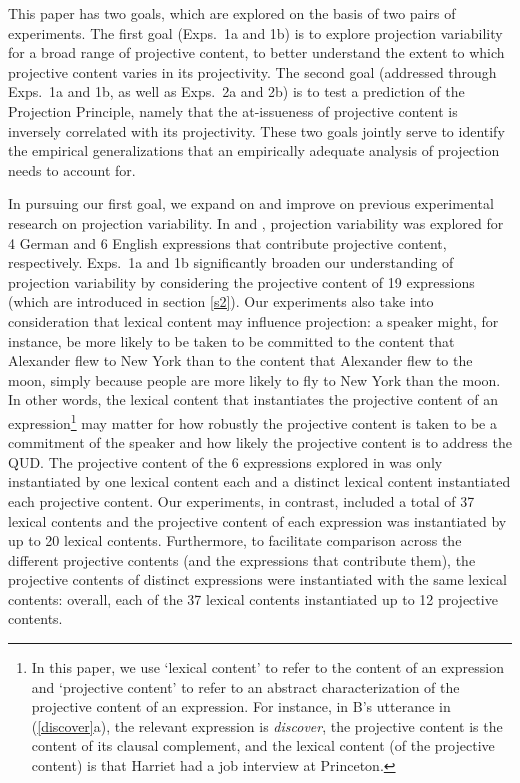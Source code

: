 \documentclass[11pt,fleqn]{article}
\newcommand{\6}{\mbox{$[\hspace*{-.6mm}[$}}
\newcommand{\9}{\mbox{$]\hspace*{-.6mm}]$}}
\begin{document}
This paper has two goals, which are explored on the basis of two pairs of experiments. The first goal (Exps.~1a and 1b) is to explore projection variability for a broad range of projective content, to better understand the extent to which projective content varies in its projectivity. The second goal (addressed through Exps.~1a and 1b, as well as Exps.~2a and 2b) is to test a prediction of the Projection Principle, namely that the at-issueness of projective content is inversely correlated with its projectivity. These two goals jointly serve to identify the empirical generalizations that an empirically adequate analysis of projection needs to account for. 

In pursuing our first goal, we expand on and improve on previous experimental research on projection variability. In \citealt{xue-onea11} and \citealt{smith-hall11}, projection variability was explored for 4 German and 6 English expressions that contribute projective content, respectively. Exps.~1a and 1b significantly broaden our understanding of projection variability by considering the projective content of 19 expressions (which are introduced in section \ref{s2}). Our experiments also take into consideration that lexical content may influence projection: a speaker might, for instance, be more likely to be taken to be committed to the content that Alexander flew to New York than to the content that Alexander flew to the moon, simply because people are more likely to fly to New York than the moon. In other words, the lexical content that instantiates the projective content of an expression\footnote{\label{f-content}In this paper, we use `lexical content' to refer to the content of an expression and `projective content' to refer to an abstract characterization of the projective content of an expression. For instance, in B's utterance in (\ref{discover}a), the relevant expression is {\em discover}, the projective content is the content of its clausal complement, and the lexical content (of the projective content) is that Harriet had a job interview at Princeton.} may matter for how robustly the projective content is taken to be a commitment of the speaker and how likely the projective content is to address the QUD. The projective content of the 6 expressions explored in \citealt{smith-hall11} was only instantiated by one lexical content each and a distinct lexical content instantiated each projective content. Our experiments, in contrast, included a total of 37 lexical contents and the projective content of each expression was instantiated by up to 20 lexical contents. Furthermore, to facilitate comparison across the different projective contents (and the expressions that contribute them), the projective contents of distinct expressions were instantiated with the same lexical contents: overall, each of the 37 lexical contents instantiated up to 12 projective contents.
\end{document}
